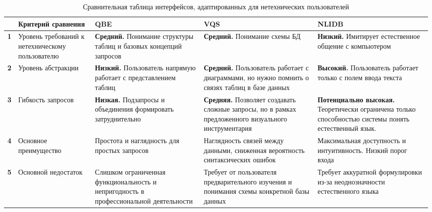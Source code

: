 \begin{table}[ht]
	\caption{Сравнительная таблица интерфейсов, адаптированных для нетехнических пользователей}\label{table:interfaces}
	\begin{tabularx}{\linewidth}{|>{\bfseries}c|X|X|X|X|}
		\hline
		\textnumero & \centering\textbf{Критерий сравнения}            & \textbf{QBE}                                                                          & \textbf{VQS}                                                                                                & \textbf{NLIDB}                                                                                               \\
		\hline
		1           & Уровень требований к нетехническому пользователю & \textbf{Средний.} Понимание структуры таблиц и базовых концепций запросов             & \textbf{Средний.} Понимание схемы БД                                                                        & \textbf{Низкий.} Имитирует естественное общение с компьютером                                                \\
		\hline
		2           & Уровень абстракции                               & \textbf{Низкий.} Пользователь напрямую работает с представлением таблиц               & \textbf{Средний.} Пользователь работает с диаграммами, но нужно помнить о связях таблиц в базе данных       & \textbf{Высокий.} Пользователь работает только с полем ввода текста                                          \\
		\hline
		3           & Гибкость запросов                                & \textbf{Низкая.} Подзапросы и объединения формировать затруднительно                  & \textbf{Средняя.} Позволяет создавать сложные запросы, но в рамках предложенного визуального инструментария & \textbf{Потенциально высокая.} Теоретически ограничена только способностью системы понять естественный язык. \\
		\hline
		4           & Основное преимущество                            & Простота и наглядность для простых запросов                                           & Наглядность связей между данными, сниженная вероятность синтаксических ошибок                               & Максимальная доступность и интуитивность. Низкий порог входа                                                 \\
		\hline
		5           & Основной недостаток                              & Слишком ограниченная функциональность и непригодность в профессиональной деятельности & Требует от пользователя предварительного изучения и понимания схемы конкретной базы данных                  & Требует аккуратной формулировки из-за неоднозначности естественного языка                                    \\
		\hline
	\end{tabularx}
\end{table}

